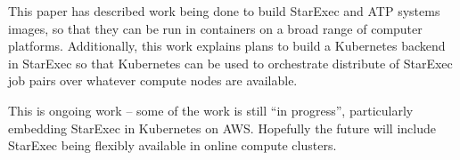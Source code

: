\documentclass{easychair}
\begin{document}
This paper has described work being done to build StarExec and ATP systems images, so that they 
can be run in containers on a broad range of computer platforms.
Additionally, this work explains plans to build a Kubernetes backend in StarExec so that 
Kubernetes can be used to orchestrate distribute of StarExec job pairs over whatever compute 
nodes are available.

This is ongoing work -- some of the work is still ``in progress'', particularly embedding
StarExec in Kubernetes on AWS.
Hopefully the future will include StarExec being flexibly available in online compute clusters.



\appendix

\newpage
\end{document}
